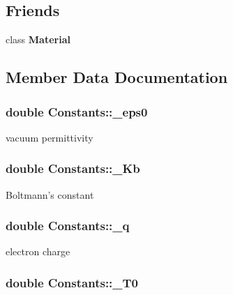 \subsection*{Friends}
\begin{DoxyCompactItemize}
\item 
\hypertarget{classConstants_aa1212b6e372a0f45d2c01f3cd203af77}{class {\bfseries Material}}\label{classConstants_aa1212b6e372a0f45d2c01f3cd203af77}

\end{DoxyCompactItemize}


\subsection{Member Data Documentation}
\hypertarget{classConstants_a8a3a4e3e37b672469a97448273a4ac04}{
\subsubsection[{\-\_\-eps0}]{\setlength{\rightskip}{0pt plus 5cm}double Constants\-::\-\_\-eps0\hspace{0.3cm}{\ttfamily [protected]}}}\label{classConstants_a8a3a4e3e37b672469a97448273a4ac04}
vacuum permittivity \hypertarget{classConstants_aae81270bc82f2f8866704ed833295d28}{
\subsubsection[{\-\_\-\-Kb}]{\setlength{\rightskip}{0pt plus 5cm}double Constants\-::\-\_\-\-Kb\hspace{0.3cm}{\ttfamily [protected]}}}\label{classConstants_aae81270bc82f2f8866704ed833295d28}
Boltmann's constant \hypertarget{classConstants_a6b6647b66be15994cc6d061f8158efaf}{
\subsubsection[{\-\_\-q}]{\setlength{\rightskip}{0pt plus 5cm}double Constants\-::\-\_\-q\hspace{0.3cm}{\ttfamily [protected]}}}\label{classConstants_a6b6647b66be15994cc6d061f8158efaf}
electron charge \hypertarget{classConstants_a649cd6bddf45790762578d642f416fdc}{
\subsubsection[{\-\_\-\-T0}]{\setlength{\rightskip}{0pt plus 5cm}double Constants\-::\-\_\-\-T0\hspace{0.3cm}{\ttfamily [protected]}}}\label{classConstants_a649cd6bddf45790762578d642f416fdc}
